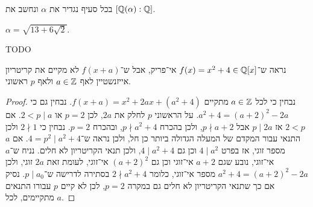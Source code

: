 \question{}
בכל סעיף נגדיר את $\alpha$ ונחשב את $[\mathbb{Q}(\alpha) : \mathbb{Q}]$.

\subquestion{}
$\alpha = \sqrt{13 + 6 \sqrt{2}}$.
\begin{solution}
	TODO
\end{solution}

\question{}
נראה ש־$f(x) = x^2 + 4 \in \mathbb{Q}[x]$ אי־פריק, אבל ש־$f(x + a)$ לא מקיים את קריטריון אייזנשטיין לאף $a \in \mathbb{Z}$ ולאף $p$ ראשוני.
\begin{proof}
	נבחין כי לכל $a \in \mathbb{Z}$ מתקיים $f(x + a) = x^2 + 2a x + (a^2 + 4)$.
	נבחין גם כי $a^2 + 4 = {(a + 2)}^2 - 2a$.
	על הראשוני $p$ לחלק את $2a$, לכן $p = 2$ או $2 < p \mid a$.
	אם $2 < p$ אז $p \mid 2a$ אבל $p \nmid a + 2$, ולכן בהכרח $p \nmid a^2 + 4$, ובהכרח $p = 2$.
	נבחין כי $2 \nmid 1$ ולכן התנאי עבור המקדם של המעלה הגדולה ביותר כן חל, ולכן נראה ש־$4 = p^2 \mid a^2 + 4$.
	אם $a$ מספר זוגי, אז בפרט $4 \mid a^2$ וכן גם $4 \mid a^2 + 4$, ולכן תנאי הקריטריון לא חלים.
	נניח ש־$a$ אי־זוגי, נובע שגם $a + 2$ אי־זוגי וכן גם ${(a + 2)}^2$ אי־זוגי, לעומת זאת $2a$ זוגי, ולכן $a^2 + 4 = {(a + 2)}^2 - 2a$ מספר אי־זוגי, כלומר $2 \nmid a^2 + 4$ בסתירה לדרישה ש־$p \mid a_0$.
	נסיק אם כך שתנאי הקריטריון לא חלים גם במקרה $p = 2$, לכן לא קיים $p$ עבורו התנאים מתקיימים, לכל $a$.
\end{proof}



